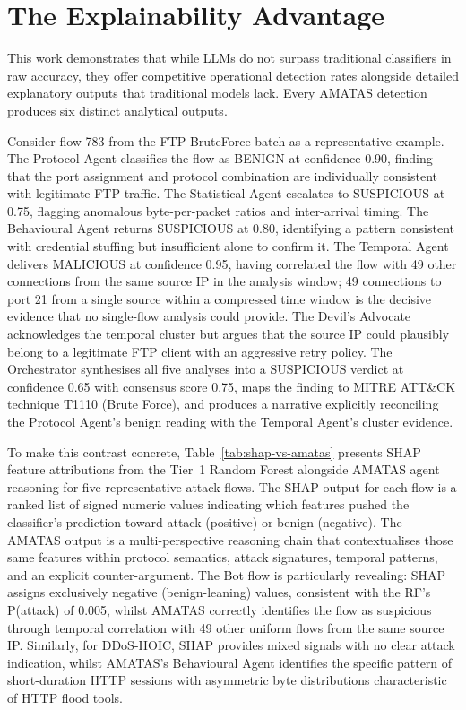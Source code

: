 \documentclass[../main.tex]{subfiles}
\begin{document}
\section{The Explainability Advantage}

This work demonstrates that while LLMs do not surpass traditional classifiers in raw accuracy, they offer competitive operational detection rates alongside detailed explanatory outputs that traditional models lack. Every AMATAS detection produces six distinct analytical outputs.

Consider flow 783 from the FTP-BruteForce batch as a representative example. The Protocol Agent classifies the flow as BENIGN at confidence 0.90, finding that the port assignment and protocol combination are individually consistent with legitimate FTP traffic. The Statistical Agent escalates to SUSPICIOUS at 0.75, flagging anomalous byte-per-packet ratios and inter-arrival timing. The Behavioural Agent returns SUSPICIOUS at 0.80, identifying a pattern consistent with credential stuffing but insufficient alone to confirm it. The Temporal Agent delivers MALICIOUS at confidence 0.95, having correlated the flow with 49 other connections from the same source IP in the analysis window; 49 connections to port 21 from a single source within a compressed time window is the decisive evidence that no single-flow analysis could provide. The Devil's Advocate acknowledges the temporal cluster but argues that the source IP could plausibly belong to a legitimate FTP client with an aggressive retry policy. The Orchestrator synthesises all five analyses into a SUSPICIOUS verdict at confidence 0.65 with consensus score 0.75, maps the finding to MITRE ATT\&CK technique T1110 (Brute Force), and produces a narrative explicitly reconciling the Protocol Agent's benign reading with the Temporal Agent's cluster evidence.

To make this contrast concrete, Table~\ref{tab:shap-vs-amatas} presents SHAP feature attributions from the Tier~1 Random Forest alongside AMATAS agent reasoning for five representative attack flows. The SHAP output for each flow is a ranked list of signed numeric values indicating which features pushed the classifier's prediction toward attack (positive) or benign (negative). The AMATAS output is a multi-perspective reasoning chain that contextualises those same features within protocol semantics, attack signatures, temporal patterns, and an explicit counter-argument. The Bot flow is particularly revealing: SHAP assigns exclusively negative (benign-leaning) values, consistent with the RF's P(attack) of 0.005, whilst AMATAS correctly identifies the flow as suspicious through temporal correlation with 49 other uniform flows from the same source IP. Similarly, for DDoS-HOIC, SHAP provides mixed signals with no clear attack indication, whilst AMATAS's Behavioural Agent identifies the specific pattern of short-duration HTTP sessions with asymmetric byte distributions characteristic of HTTP flood tools.
\end{document}

